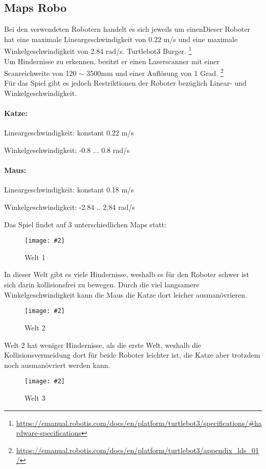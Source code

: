 \documentclass[
a4paper,     %
12pt         %
]{scrartcl}  %
\newcommand{\mygraphics}[3]{
\begin{figure}[!h]
  \begin{center}
    \texttt{[image: \#2]} \\
    \caption{#3}\label{fig:#2}
  \end{center}
\end{figure}

}
\begin{document}
\subsection{Maps Robo}
Bei den verwendeten Robotern handelt es sich jeweils um einenDieser Roboter hat eine maximale Lineargeschwindigkeit von 0.22 m/s und eine maximale Winkelgeschwindigkeit von 2.84 rad/s. Turtlebot3 Burger. \footnote{\url{https://emanual.robotis.com/docs/en/platform/turtlebot3/specifications/\#hardware-specifications}}\\
Um Hindernisse zu erkennen, besitzt er einen Laserscanner mit einer Scanreichweite von 120 $\sim$ 3500mm und einer Auflösung von 1 Grad. \footnote{\url{https://emanual.robotis.com/docs/en/platform/turtlebot3/appendix_lds_01/}} \\
Für das Spiel gibt es jedoch Restriktionen der Roboter bezüglich Linear- und Winkelgeschwindigkeit.\\
\paragraph{Katze:}
\begin{description}
 \item Lineargeschwindigkeit: konstant 0.22 m/s
 \item Winkelgeschwindigkeit: -0.8 ... 0.8 rad/s
\end{description}	
\paragraph{Maus:}
\begin{description}
 \item Lineargeschwindigkeit: konstant 0.18 m/s
 \item Winkelgeschwindigkeit: -2.84 .. 2.84 rad/s
\end{description}
Das  Spiel findet auf 3 unterschiedlichen Maps statt:
\mygraphics{0.6\textwidth}{Welt1.png}{Welt 1}

In dieser Welt gibt es viele Hindernisse, weshalb es für den Roboter schwer ist sich darin kollisionsfrei zu bewegen. Durch die viel langsamere Winkelgeschwindigkeit kann die Maus die Katze dort leicher ausmanövrieren.
\mygraphics{0.6\textwidth}{Welt2.png}{Welt 2}

Welt 2 hat weniger Hindernisse, als die erste Welt, weshalb die Kollisionsvermeidung dort für beide Roboter leichter ist, die Katze aber trotzdem noch ausmanövriert werden kann.
\mygraphics{0.6\textwidth}{Welt3.png}{Welt 3}
\end{document}
